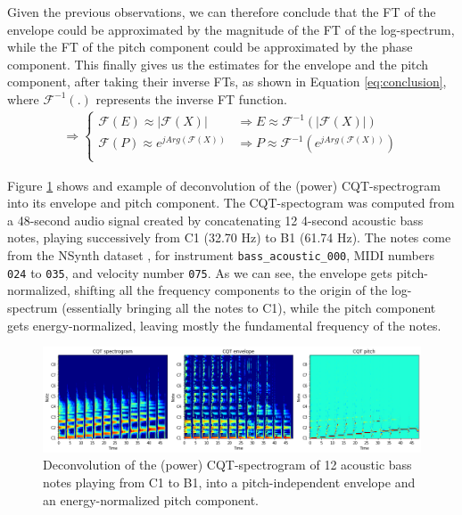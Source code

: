 \documentclass[journal]{IEEEtran}
\begin{document}
Given the previous observations, we can therefore conclude that the FT of the envelope could be approximated by the magnitude of the FT of the log-spectrum, while the FT of the pitch component could be approximated by the phase component. This finally gives us the estimates for the envelope and the pitch component, after taking their inverse FTs, as shown in Equation \ref{eq:conclusion}, where $\mathcal{F}^{-1}(.)$ represents the inverse FT function.
\begin{equation}
\label{eq:conclusion}
\begin{split}
\Rightarrow 
\begin{cases}
\mathcal{F}(E) \approx |\mathcal{F}(X)| &\Rightarrow E \approx \mathcal{F}^{-1}(|\mathcal{F}(X)|) \\
\mathcal{F}(P) \approx e^{j Arg(\mathcal{F}(X))} &\Rightarrow P \approx \mathcal{F}^{-1}(e^{j Arg(\mathcal{F}(X))}) \\
\end{cases}
\end{split}
\end{equation}

Figure \ref{fig:deconvolution} shows and example of deconvolution of the (power) CQT-spectrogram into its envelope and pitch component. The CQT-spectogram was computed from a 48-second audio signal created by concatenating 12 4-second acoustic bass notes, playing successively from C1 (32.70 Hz) to B1 (61.74 Hz). The notes come from the NSynth dataset \cite{engel2017}, for instrument \texttt{bass\_acoustic\_000}, MIDI numbers \texttt{024} to \texttt{035}, and velocity number \texttt{075}. As we can see, the envelope gets pitch-normalized, shifting all the frequency components to the origin of the log-spectrum (essentially bringing all the notes to C1), while the pitch component gets energy-normalized, leaving mostly the fundamental frequency of the notes.

\begin{figure}[htp]
    \centering
    \includegraphics[width=\textwidth]{deconvolution.png}
    \caption{Deconvolution of the (power) CQT-spectrogram of 12 acoustic bass notes playing from C1 to B1, into a pitch-independent envelope and an energy-normalized pitch component.}
    \label{fig:deconvolution}
\end{figure}
\end{document}
